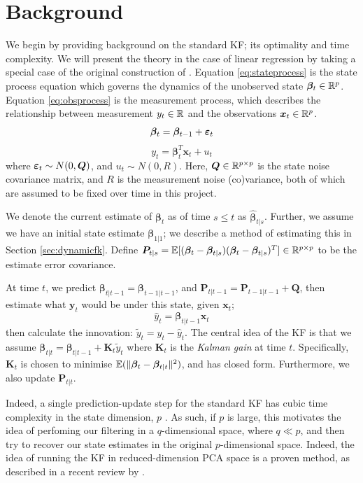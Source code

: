 \section{Background}
We begin by providing background on the standard KF; its optimality and time complexity. We will present the theory in the case of linear regression by taking a special case of the original construction of \cite{kalman1960}. Equation \ref{eq:stateprocess} is the state process equation which governs the dynamics of the unobserved state $\bm{\beta}_t \in \mathbb{R}^p$. Equation \ref{eq:obsprocess} is the measurement process, which describes the relationship between measurement $y_t \in \mathbb{R}$ and the observations $\bm{x}_t\in \mathbb{R}^p$.
\begin{equation}\label{eq:stateprocess}
    \bm{\beta}_t=\bm{\beta}_{t-1}+\bm{\varepsilon}_t
\end{equation}
\begin{equation}\label{eq:obsprocess}
    y_t=\bm{\beta}_t^T\bm{x}_t+u_t
\end{equation}
where $\bm{\varepsilon}_t \sim N(0, \bm{Q})$, and $u_t \sim N(0, R)$. Here, $\bm{Q}\in \mathbb{R}^{p\times p}$ is the state noise covariance matrix, and $R$ is the measurement noise (co)variance, both of which are assumed to be fixed over time in this project.

We denote the current estimate of $\bm{\beta}_{t}$ as of time $s\le t$ as $\hat{\bm{\beta}}_{t|s}$. Further, we assume we have an initial state estimate $\bm{\beta}_{1|1}$; we describe a method of estimating this in Section \ref{sec:dynamicfk}. Define $\bm{P}_{t|s}=\mathbb{E}[(\bm{\beta}_t-\bm{\beta}_{t|s})(\bm{\beta}_t-\bm{\beta}_{t|s})^T] \in \mathbb{R}^{p \times p}$ to be the estimate error covariance.

At time $t$, we predict $\bm{\beta}_{t|t-1} = \bm{\beta}_{t-1|t-1}$, and $\bm{P}_{t|t-1} = \bm{P}_{t-1|t-1} + \bm{Q}$, then estimate what $\bm{y}_t$ would be under this state, given $\bm{x}_t$;
\[
\hat{y}_{t} = \bm{\beta}_{t|t-1} \bm{x}_t    
\]
then calculate the innovation: $\tilde{y}_t = y_t - \hat{y}_t$. The central idea of the KF is that we assume $\bm{\beta}_{t|t}=\bm{\beta}_{t|t-1} + \bm{K}_t \tilde{y}_t$ where $\bm{K}_t$ is the \textit{Kalman gain} at time $t$. Specifically, $\bm{K}_t$ is chosen to minimise $\mathbb{E}(\|\bm{\beta}_t - \bm{\beta}_{t|t}\|^2)$, and has closed form. Furthermore, we also update $\bm{P}_{t|t}$.

Indeed, a single prediction-update step for the standard KF has cubic time complexity in the state dimension, $p$ \cite{schmidt2024rankreducedkalmanfilterapproximate}.  As such, if $p$ is large, this motivates the idea of perfoming our filtering in a $q$-dimensional space, where $q\ll p$, and then try to recover our state estimates in the original $p$-dimensional space.
 Indeed, the idea of running the KF in reduced-dimension PCA space is a proven method, as described in a recent review by \textcite{Li_Li_Gao_Gao_2026}. 